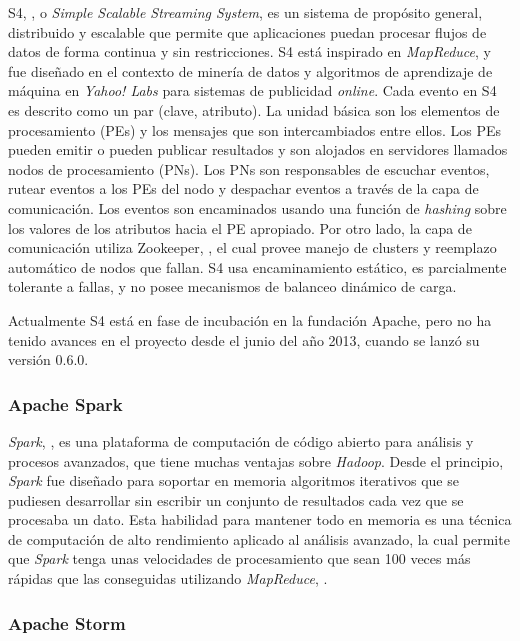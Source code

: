 S4, \cite{NeumeyerS4}, o \textit{Simple Scalable Streaming System}, es un sistema de propósito general, distribuido y escalable que permite que aplicaciones puedan procesar flujos de datos de forma continua y sin restricciones. S4 está inspirado en \textit{MapReduce}, y fue diseñado en el contexto de minería de datos y algoritmos de aprendizaje de máquina en \textit{Yahoo! Labs} para sistemas de publicidad \textit{online}. Cada evento en S4 es descrito como un par (clave, atributo). La unidad básica son los elementos de procesamiento (PEs) y los mensajes que son intercambiados entre ellos. Los PEs pueden emitir o pueden publicar resultados y son alojados en servidores llamados nodos de procesamiento (PNs). Los PNs son responsables de escuchar eventos, rutear eventos a los PEs del nodo y despachar eventos a través de la capa de comunicación. Los eventos son encaminados usando una función de \textit{hashing} sobre los valores de los atributos hacia el PE apropiado. Por otro lado, la capa de comunicación utiliza Zookeeper, \cite{HuntZookeeper}, el cual provee manejo de clusters y reemplazo automático de nodos que fallan. S4 usa encaminamiento estático, es parcialmente tolerante a fallas, y no posee mecanismos de balanceo dinámico de carga.
					
Actualmente S4 está en fase de incubación en la fundación Apache, pero no ha tenido avances en el proyecto desde el junio del año 2013, cuando se lanzó su versión 0.6.0.

\subsubsection*{Apache Spark}
\label{arte:SPS:spark}

\textit{Spark}, \cite{SparkOnline}, es una plataforma de computación de código abierto para análisis y procesos avanzados, que tiene muchas ventajas sobre \textit{Hadoop}. Desde el principio, \textit{Spark} fue diseñado para soportar en memoria algoritmos iterativos que se pudiesen desarrollar sin escribir un conjunto de resultados cada vez que se procesaba un dato. Esta habilidad para mantener todo en memoria es una técnica de computación de alto rendimiento aplicado al análisis avanzado, la cual permite que \textit{Spark} tenga unas velocidades de procesamiento que sean 100 veces más rápidas que las conseguidas utilizando \textit{MapReduce}, \cite{Spark}.

\subsubsection*{Apache Storm}
\label{arte:SPS:storm}
					
